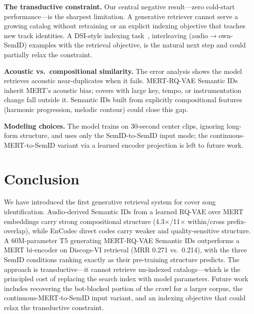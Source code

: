 \documentclass[conference]{IEEEtran}
\begin{document}
\textbf{The transductive constraint.} Our central negative result---zero cold-start performance---is the sharpest limitation. A generative retriever cannot serve a growing catalog without retraining or an explicit indexing objective that teaches new track identities. A DSI-style indexing task~\cite{tay2022dsi}, interleaving (audio$\rightarrow$own-SemID) examples with the retrieval objective, is the natural next step and could partially relax the constraint.

\textbf{Acoustic vs.\ compositional similarity.} The error analysis shows the model retrieves acoustic near-duplicates when it fails. MERT-RQ-VAE Semantic IDs inherit MERT's acoustic bias; covers with large key, tempo, or instrumentation change fall outside it. Semantic IDs built from explicitly compositional features (harmonic progression, melodic contour) could close this gap.

\textbf{Modeling choices.} The model trains on 30-second center clips, ignoring long-form structure, and uses only the SemID-to-SemID input mode; the continuous-MERT-to-SemID variant via a learned encoder projection is left to future work.

\section{Conclusion}
We have introduced the first generative retrieval system for cover song identification. Audio-derived Semantic IDs from a learned RQ-VAE over MERT embeddings carry strong compositional structure (4.3$\times$/11$\times$ within/cross prefix-overlap), while EnCodec direct codes carry weaker and quality-sensitive structure. A 60M-parameter T5 generating MERT-RQ-VAE Semantic IDs outperforms a MERT bi-encoder on Discogs-VI retrieval (MRR 0.271 vs.\ 0.214), with the three SemID conditions ranking exactly as their pre-training structure predicts. The approach is transductive---it cannot retrieve un-indexed catalogs---which is the principled cost of replacing the search index with model parameters. Future work includes recovering the bot-blocked portion of the crawl for a larger corpus, the continuous-MERT-to-SemID input variant, and an indexing objective that could relax the transductive constraint.
\end{document}
